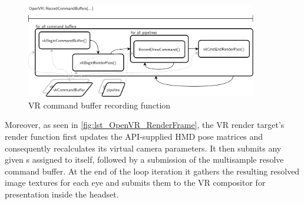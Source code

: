 \begin{figure}[htb]
  \centering
  \includegraphics[width=0.9\textwidth]{pictures/Tachyon_OpenVR_RecordCommandBuffers}
  \caption[VR render target's RecordCommandBuffers(...)]{VR command buffer recording function}\label{fig:lst_OpenVR_RecordCommandBuffers}
\end{figure} 

Moreover, as seen in \autoref{fig:lst_OpenVR_RenderFrame}, the \gls{VR} render target's  render function first updates the API-supplied \gls{HMD} pose matrices and consequently recalculates its virtual camera parameters. It then submits any given s assigned to itself, followed by a submission of the multisample resolve command buffer. At the end of the loop iteration it gathers the resulting resolved image textures for each eye and submits them to the VR compositor for presentation inside the headset. 

